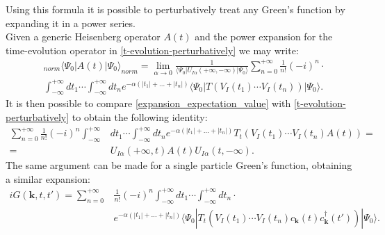Using this formula it is possible to perturbatively treat any Green's function by expanding it in a power series.\\
Given a generic Heisenberg operator $A(t)$ and the power expansion for the time-evolution operator in \ref{t-evolution-perturbatively} we may write:
\begin{equation}
\begin{split}
    &_{norm}\langle \Psi_0|A(t)|\Psi_0\rangle_{norm}=\lim_{\alpha\to 0}\frac{1}{\langle \Psi_0|U_{I\alpha}(+\infty,-\infty)|\Psi_0\rangle}\sum_{n=0}^{+\infty}\frac{1}{n!}\left(-i\right)^n\cdot \\
    &\int_{-\infty}^{+\infty}dt_1\cdots\int_{-\infty}^{+\infty}dt_n e^{-\alpha(|t_1|+...+|t_n|)}\langle\Psi_0|T\left(V_I(t_1)\cdots V_I(t_n)\right)|\Psi_0\rangle.
\end{split}
\label{expansion_expectation_value}
\end{equation}
It is then possible to compare \ref{expansion_expectation_value} with \ref{t-evolution-perturbatively} to obtain the following identity:
\begin{equation}
\begin{split}
    \sum_{n=0}^{+\infty}\frac{1}{n!}(-i)^n\int_{-\infty}^{+\infty}&dt_1\cdots\int_{-\infty}^{+\infty}dt_ne^{-\alpha(|t_1|+...+|t_n|)}T_t\left(V_I(t_1)\cdots V_I(t_n)A(t)\right)=\\
    =&U_{I\alpha}(+\infty,t)A(t)U_{I\alpha}(t,-\infty).
\end{split}
\end{equation}
The same argument can be made for a single particle Green's function, obtaining a similar expansion:
\begin{equation}
\begin{split}
    iG(\mathbf{k},t,t')=\sum_{n=0}^{+\infty}&\frac{1}{n!}(-i)^n\int_{-\infty}^{+\infty}dt_1\cdots\int_{-\infty}^{+\infty}dt_n\cdot \\
    &e^{-\alpha(|t_1|+...+|t_n|)}\langle\Psi_0|T_t\left(V_I(t_1)\cdots V_I(t_n)c_\mathbf{k}(t)c^\dagger_{\mathbf{k}}(t')\right)|\Psi_0\rangle.
\end{split}
\end{equation}
